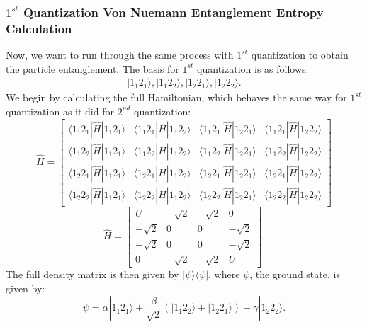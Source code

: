 \subsubsection{\textbf{$1^{st}$ Quantization Von Nuemann Entanglement Entropy Calculation}}
Now, we want to run through the same process with $1^{st}$ quantization to obtain the particle entanglement. The basis for $1^{st}$ quantization is as follows:
\begin{align}
|1_1 2_1 \rangle, |1_1 2_2 \rangle, |1_2 2_1 \rangle, |1_2 2_2 \rangle.
\end{align}
\noindent We begin by calculating the full Hamiltonian, which behaves the same way for $1^{st}$ quantization as it did for $2^{nd}$ quantization:
\begin{equation}
\hat{H} = \begin{bmatrix} \langle 1_1 2_1 | \hat{H} | 1_1 2_1 \rangle & \langle 1_1 2_1 | \hat{H} | 1_1 2_2 \rangle & \langle 1_1 2_1 | \hat{H} | 1_2 2_1 \rangle & \langle 1_1 2_1 | \hat{H} | 1_2 2_2 \rangle \\ \langle 1_1 2_2 | \hat{H} | 1_1 2_1 \rangle & \langle 1_1 2_2 | \hat{H} | 1_1 2_2 \rangle & \langle 1_1 2_2 | \hat{H} | 1_2 2_1 \rangle & \langle 1_1 2_2 | \hat{H} | 1_2 2_2 \rangle \\ \langle 1_2 2_1 | \hat{H} | 1_1 2_1 \rangle & \langle 1_2 2_1 | \hat{H} | 1_1 2_2 \rangle & \langle 1_2 2_1 | \hat{H} | 1_2 2_1 \rangle & \langle 1_2 2_1 | \hat{H} | 1_2 2_2 \rangle \\ \langle 1_2 2_2 | \hat{H} | 1_1 2_1 \rangle & \langle 1_2 2_2 | \hat{H} | 1_1 2_2 \rangle & \langle 1_2 2_2 | \hat{H} | 1_2 2_1 \rangle & \langle 1_2 2_2 | \hat{H} | 1_2 2_2 \rangle \end{bmatrix} 
\end{equation}
\begin{equation}
\hat{H} = \begin{bmatrix} U & -\sqrt{2} & -\sqrt{2} & 0 \\ -\sqrt{2} & 0 & 0 & -\sqrt{2} \\ -\sqrt{2} & 0 & 0 & -\sqrt{2} \\ 0 & -\sqrt{2} & -\sqrt{2} & U \end{bmatrix}.
\end{equation}
\noindent The full density matrix is then given by $|\psi \rangle \langle \psi|$, where $\psi$, the ground state, is given by:
\begin{equation*}
\psi = \alpha |1_1 2_1 \rangle + \frac{\beta}{\sqrt{2}} \left( |1_1 2_2 \rangle + |1_2 2_1 \rangle \right) + \gamma |1_2 2_2 \rangle.
\end{equation*}

